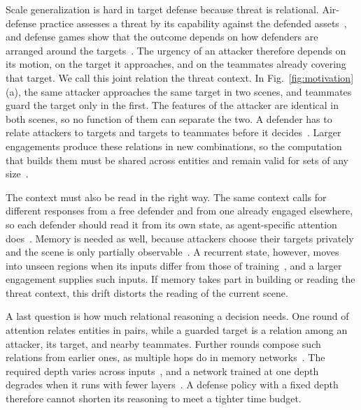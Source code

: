 Scale generalization is hard in target defense because threat is relational. Air-defense practice assesses a threat by its capability against the defended assets~\cite{roux2007tewa}, and defense games show that the outcome depends on how defenders are arranged around the targets~\cite{shishika2020perimeter,garcia2021mpme}. The urgency of an attacker therefore depends on its motion, on the target it approaches, and on the teammates already covering that target. We call this joint relation the threat context. In Fig.~\ref{fig:motivation}(a), the same attacker approaches the same target in two scenes, and teammates guard the target only in the first. The features of the attacker are identical in both scenes, so no function of them can separate the two. A defender has to relate attackers to targets and targets to teammates before it decides~\cite{battaglia2018relational,zambaldi2019relational}. Larger engagements produce these relations in new combinations, so the computation that builds them must be shared across entities and remain valid for sets of any size~\cite{zaheer2017deepsets,lee2019settransformer}.

The context must also be read in the right way. The same context calls for different responses from a free defender and from one already engaged elsewhere, so each defender should read it from its own state, as agent-specific attention does~\cite{iqbal2019maac,iqbal2021refil}. Memory is needed as well, because attackers choose their targets privately and the scene is only partially observable~\cite{oliehoek2016decpomdp,hausknecht2015drqn}. A recurrent state, however, moves into unseen regions when its inputs differ from those of training~\cite{lamb2016professor,bengio2015scheduled}, and a larger engagement supplies such inputs. If memory takes part in building or reading the threat context, this drift distorts the reading of the current scene.

A last question is how much relational reasoning a decision needs. One round of attention relates entities in pairs, while a guarded target is a relation among an attacker, its target, and nearby teammates. Further rounds compose such relations from earlier ones, as multiple hops do in memory networks~\cite{sukhbaatar2015memory,battaglia2018relational}. The required depth varies across inputs~\cite{graves2016act,kaya2019overthinking}, and a network trained at one depth degrades when it runs with fewer layers~\cite{fan2020layerdrop,kaya2019overthinking}. A defense policy with a fixed depth therefore cannot shorten its reasoning to meet a tighter time budget.

